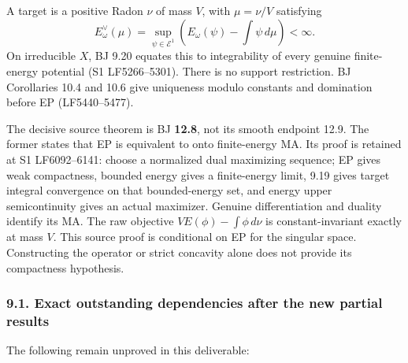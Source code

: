 \documentclass[
  10pt,
]{article}
\begin{document}
A target is a positive Radon \(\nu\) of mass \(V\), with \(\mu=\nu/V\)
satisfying \[E_\omega^\vee(\mu)=\sup_{\psi\in\mathcal E^1}
\left(E_\omega(\psi)-\int\psi\,d\mu\right)<\infty.\] On irreducible
\(X\), BJ 9.20 equates this to integrability of every genuine
finite-energy potential (S1 LF5266--5301). There is no support
restriction. BJ Corollaries 10.4 and 10.6 give uniqueness modulo
constants and domination before EP (LF5440--5477).

The decisive source theorem is BJ \textbf{12.8}, not its smooth endpoint
12.9. The former states that EP is equivalent to onto finite-energy MA.
Its proof is retained at S1 LF6092--6141: choose a normalized dual
maximizing sequence; EP gives weak compactness, bounded energy gives a
finite-energy limit, 9.19 gives target integral convergence on that
bounded-energy set, and energy upper semicontinuity gives an actual
maximizer. Genuine differentiation and duality identify its MA. The raw
objective \(VE(\phi)-\int\phi\,d\nu\) is constant-invariant exactly at
mass \(V\). This source proof is conditional on EP for the singular
space. Constructing the operator or strict concavity alone does not
provide its compactness hypothesis.

\subsubsection{9.1. Exact outstanding dependencies after the new partial
results}\label{exact-outstanding-dependencies-after-the-new-partial-results}

The following remain unproved in this deliverable:
\end{document}
